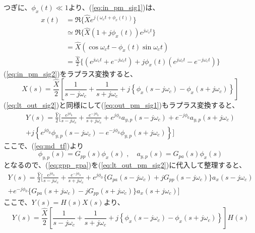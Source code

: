 \documentclass[book]{jlreq}
\begin{document}
つぎに、$\phi_x(t) \ll 1$より、(\ref{eq:in_pm_sig1})は、
%
\begin{equation}
    \begin{split}
        x(t) &= \Re\{\hat{X} e^{j(\omega_ct + \phi_x(t))}\} \\
            &\simeq \Re\{\hat{X}(1+j\phi_x(t)) e^{j\omega_c t}\} \\
            &= \hat{X} (\cos\omega_c t - \phi_x(t)\sin\omega_c t ) \\
            &= \frac{\hat{X}}{2}\{(e^{j\omega_c t} + e^{-j\omega_c t}) + j \phi_x(t)(e^{j\omega_c t} - e^{-j\omega_c t})\} 
            \label{eq:in_pm_sig2}
    \end{split}
\end{equation}
%
(\ref{eq:in_pm_sig2})をラプラス変換すると、
%
\begin{equation}
    X(s) = \frac{\hat{X}}{2}\left [\frac{1}{s-j\omega_c}+\frac{1}{s+j\omega_c} 
    + j \left \{\phi_x(s - j\omega_c) - \phi_x(s+j\omega_c)\right \} \right ]
    \label{eq:lt_in_pm_sig2}
\end{equation}
%
(\ref{eq:lt_out_sig2})と同様にして(\ref{eq:out_pm_sig1})もラプラス変換すると、
%
\begin{multline}
    Y(s) = \frac{\hat{Y}}{2}\biggr [\frac{e^{j\phi_0}}{s-j\omega_c}+\frac{e^{-j\phi_0}}{s+j\omega_c} 
        + e^{j\phi_0}a_{y, p}(s - j\omega_c) + e^{-j\phi_0}a_{y, p}(s+j\omega_c) \\
        + j\left \{e^{j\phi_0}\phi_{y,p}(s-j\omega_c) - e^{-j\phi_0}\phi_{y,p}(s+j\omega_c) \right \} \biggl ]
        \label{eq:lt_out_pm_sig2}
\end{multline}
%
ここで、(\ref{eq:md_tf})より
%
\begin{equation}
    \phi_{y, p}(s) = G_{pp}(s){\phi_x(s)}\; , \quad a_{y, p}(s) = G_{pa}(s)\phi_x(s)
    \label{eq:gpp_gpa}
\end{equation}
%
となるので、(\ref{eq:gpp_gpa})を(\ref{eq:lt_out_pm_sig2})に代入して整理すると、
%
\begin{multline}
    Y(s) = \frac{\hat{Y}}{2}\biggr [\frac{e^{j\phi_0}}{s-j\omega_c}+\frac{e^{-j\phi_0}}{s+j\omega_c} 
    + e^{j\phi_0}\{G_{pa}(s-j\omega_c)+j G_{pp}(s-j\omega_c)\}a_x(s-j\omega_c) \\
    + e^{-j\phi_0}\{G_{pa}(s+j\omega_c)- j G_{pp}(s+j\omega_c)\}a_x(s+j\omega_c)\biggl ]
    \label{eq:lt_out_pm_sig3}
\end{multline}
%
ここで、$Y(s) = H(s) X(s)$より、
%
\begin{equation}
    Y(s) = \frac{\hat{X}}{2}\left [\frac{1}{s-j\omega_c}+\frac{1}{s+j\omega_c} 
    + j \left \{\phi_x(s - j\omega_c) - \phi_x(s+j\omega_c)\right \} \right ] H(s)
    \label{eq:lt_out_pm_sig4}
\end{equation}
\end{document}
